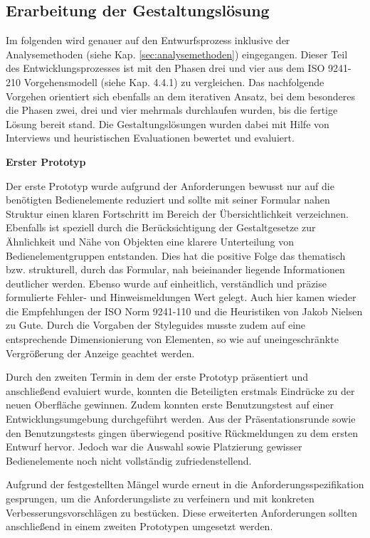 
\subsection{Erarbeitung der Gestaltungslösung}
Im folgenden wird genauer auf den Entwurfsprozess inklusive der Analysemethoden (siehe Kap. \ref{sec:analysemethoden}) eingegangen. Dieser Teil des Entwicklungsprozesses ist mit den Phasen drei und vier aus dem ISO 9241-210 Vorgehensmodell (siehe Kap. 4.4.1) zu vergleichen. Das nachfolgende Vorgehen orientiert sich ebenfalls an dem iterativen Ansatz, bei dem besonderes die Phasen zwei, drei und vier mehrmals durchlaufen wurden, bis die fertige Lösung bereit stand. Die Gestaltungslösungen wurden dabei mit Hilfe von Interviews und heuristischen Evaluationen bewertet und evaluiert.

\textbf{Erster Prototyp}

Der erste Prototyp wurde aufgrund der Anforderungen bewusst nur auf die benötigten Bedienelemente reduziert und sollte mit seiner Formular nahen Struktur einen klaren Fortschritt im Bereich der Übersichtlichkeit verzeichnen. Ebenfalls ist speziell durch die Berücksichtigung der Gestaltgesetze zur Ähnlichkeit und Nähe von Objekten eine klarere Unterteilung von Bedienelementgruppen entstanden. Dies hat die positive Folge das thematisch bzw. strukturell, durch das Formular, nah beieinander liegende Informationen deutlicher werden. Ebenso wurde auf einheitlich, verständlich und präzise formulierte Fehler- und Hinweismeldungen Wert gelegt. Auch hier kamen wieder die Empfehlungen der ISO Norm 9241-110 und die Heuristiken von Jakob Nielsen zu Gute. Durch die Vorgaben der Styleguides musste zudem auf eine entsprechende Dimensionierung von Elementen, so wie auf uneingeschränkte Vergrößerung der Anzeige geachtet werden.

Durch den zweiten Termin in dem der erste Prototyp präsentiert und anschließend evaluiert wurde, konnten die Beteiligten erstmals Eindrücke zu der neuen Oberfläche gewinnen. Zudem konnten erste Benutzungstest auf einer Entwicklungsumgebung durchgeführt werden. Aus der Präsentationsrunde sowie den Benutzungstests gingen überwiegend positive Rückmeldungen zu dem ersten Entwurf hervor. Jedoch war die Auswahl sowie Platzierung gewisser Bedienelemente noch nicht vollständig zufriedenstellend. 

Aufgrund der festgestellten Mängel wurde erneut in die Anforderungsspezifikation gesprungen, um die Anforderungsliste zu verfeinern und mit konkreten Verbesserungsvorschlägen zu bestücken. Diese erweiterten Anforderungen sollten anschließend in einem zweiten Prototypen umgesetzt werden.

